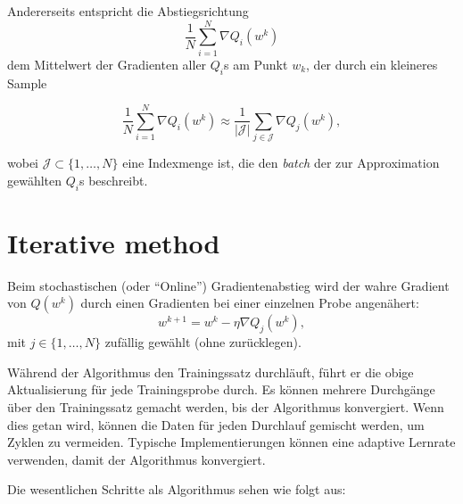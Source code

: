 \documentclass[]{book}
\theoremstyle{definition}
\theoremstyle{definition}
\theoremstyle{definition}
\theoremstyle{definition}
\theoremstyle{remark}
\begin{document}
Andererseits entspricht die Abstiegsrichtung
\begin{equation*}
\frac{1}{N} \sum_{i=1}^N \nabla Q_i(w^k)
\end{equation*}
dem Mittelwert der Gradienten aller \(Q_i\)s am Punkt \(w_k\), der durch ein kleineres Sample

\begin{equation*}
\frac{1}{N} \sum_{i=1}^N \nabla Q_i(w^k) \approx \frac{1}{|\mathcal J|} \sum_{j\in \mathcal J} \nabla Q_j(w^k),
\end{equation*}

wobei \(\mathcal J \subset \{1, \dotsc, N\}\) eine Indexmenge ist, die den \emph{batch} der zur Approximation gewählten \(Q_i\)s beschreibt.

\hypertarget{iterative_method}{%
\section{Iterative method}\label{iterative_method}}

Beim stochastischen (oder ``Online'') Gradientenabstieg wird der wahre Gradient von \(Q(w^k)\) durch einen Gradienten bei einer einzelnen Probe angenähert:
\begin{equation*}
w^{k+1} = w^k-\eta \nabla Q_j(w^k),
\end{equation*}
mit \(j\in \{1,\dotsc, N\}\) zufällig gewählt (ohne zurücklegen).

Während der Algorithmus den Trainingssatz durchläuft, führt er die obige Aktualisierung für jede Trainingsprobe durch. Es können mehrere Durchgänge über den Trainingssatz gemacht werden, bis der Algorithmus konvergiert. Wenn dies getan wird, können die Daten für jeden Durchlauf gemischt werden, um Zyklen zu vermeiden. Typische Implementierungen können eine adaptive Lernrate verwenden, damit der Algorithmus konvergiert.

Die wesentlichen Schritte als Algorithmus sehen wie folgt aus:
\end{document}
